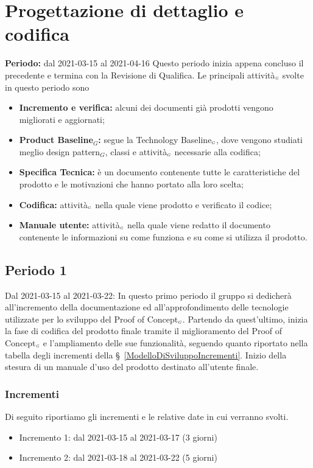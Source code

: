 \section{Progettazione di dettaglio e codifica}\label{PianificazioneProgettazioneDettaglio}
\textbf{Periodo:} dal 2021-03-15 al 2021-04-16
Questo periodo inizia appena concluso il precedente e termina con la Revisione di Qualifica.
Le principali attività$_{\scaleto{G}{3pt}}$ svolte in questo periodo sono
\begin{itemize}
	\item \textbf{Incremento e verifica:} alcuni dei documenti già prodotti vengono migliorati e aggiornati;
	\item \textbf{Product Baseline$_G$:} segue la Technology Baseline$_{\scaleto{G}{3pt}}$, dove vengono studiati meglio design pattern$_G$, classi e attività$_{\scaleto{G}{3pt}}$ necessarie alla codifica;
	\item \textbf{Specifica Tecnica:} è un documento contenente tutte le caratteristiche del prodotto e le motivazioni che hanno portato alla loro scelta;
	\item \textbf{Codifica:} attività$_{\scaleto{G}{3pt}}$ nella quale viene prodotto e verificato il codice;
	\item \textbf{Manuale utente:} attività$_{\scaleto{G}{3pt}}$ nella quale viene redatto il documento contenente le informazioni su come funziona e su come si utilizza il prodotto.
\end{itemize}
\subsection{Periodo 1}\label{PianificazioneProgettazioneDettaglioPeriodo1}
Dal 2021-03-15 al 2021-03-22: In questo primo periodo il gruppo si dedicherà all'incremento della documentazione ed all'approfondimento delle tecnologie utilizzate per lo sviluppo del Proof of Concept$_{\scaleto{G}{3pt}}$. Partendo da quest'ultimo, inizia la fase di codifica del prodotto finale tramite il miglioramento del Proof of Concept$_{\scaleto{G}{3pt}}$ e l'ampliamento delle sue funzionalità, seguendo quanto riportato nella tabella degli incrementi della \S~\ref{ModelloDiSviluppoIncrementi}. Inizio della stesura di un manuale d'uso del prodotto destinato all'utente finale.
\subsubsection{Incrementi}\label{PianificazioneProgettazioneDettaglioPeriodo1Incrementi}
Di seguito riportiamo gli incrementi e le relative date in cui verranno svolti.
\begin{itemize}
	\item Incremento 1: dal 2021-03-15 al 2021-03-17 (3 giorni)
	\item Incremento 2: dal 2021-03-18 al 2021-03-22 (5 giorni)
\end{itemize}
